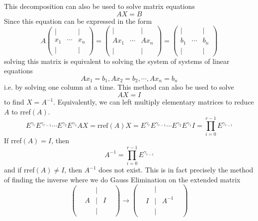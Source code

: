   This decomposition can also be used to solve matrix equations
  \begin{equation}
    A X = B
  \end{equation}
  Since this equation can be expressed in the form
  \begin{equation}
    A \begin{pmatrix}
    | & & | \\ x_1 & \cdots & x_n \\ | & & | 
    \end{pmatrix} = \begin{pmatrix}
    | & & | \\ A x_1 & \cdots & A x_n \\ | & & | 
    \end{pmatrix} = \begin{pmatrix}
    | & & | \\ b_1 & \cdots & b_n \\ | & & | 
    \end{pmatrix}
  \end{equation}
  solving this matrix is equivalent to solving the system of systems of linear equations 
  \begin{equation}
    Ax_1 = b_1, Ax_2 = b_2, \cdots, Ax_n = b_n
  \end{equation}
  i.e. by solving one column at a time. This method can also be used to solve 
  \begin{equation}
    A X = I
  \end{equation}
  to find $X = A^{-1}$. Equivalently, we can left multiply elementary matrices to reduce $A$ to rref$(A)$. 
  \begin{equation}
    E^{\gamma_r} E^{\gamma_{r-1}} \cdots E^{\gamma_2} E^{\gamma_1} A X = \text{rref}(A) X = E^{\gamma_r} E^{\gamma_{r-1}} \cdots E^{\gamma_2} E^{\gamma_1} I = \prod_{i = 0}^{r-1} E^{\gamma_{r-i}}
  \end{equation}
  If rref$(A)= I$, then 
  \begin{equation}
    A^{-1} = \prod_{i = 0}^{r-1} E^{\gamma_{r-i}}
  \end{equation}
  and if rref$(A) \neq I$, then $A^{-1}$ does not exist. This is in fact precisely the method of finding the inverse where we do Gauss Elimination on the extended matrix
  \begin{equation}
    \begin{pmatrix}
    & &| & & \\ & A &| & I & \\ & &| & & 
    \end{pmatrix} \to \begin{pmatrix}
    & &| & & \\ & I &| & A^{-1} & \\ & &| & & 
    \end{pmatrix}
  \end{equation}

